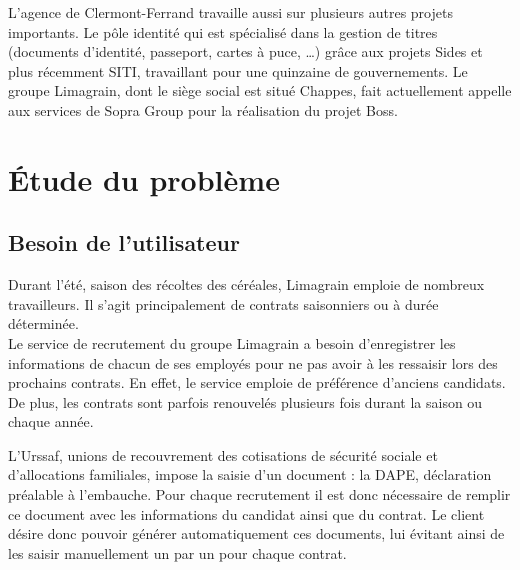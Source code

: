 L'agence de Clermont-Ferrand travaille aussi sur plusieurs autres projets importants.
Le pôle identité qui est spécialisé dans la gestion de titres (documents d'identité, passeport, cartes à puce, \ldots) grâce aux projets Sides et plus récemment SITI, travaillant pour une quinzaine de gouvernements.
Le groupe Limagrain, dont le siège social est situé Chappes, fait actuellement appelle aux services de Sopra Group pour la réalisation du projet Boss.


\section{Étude du problème}


\subsection{Besoin de l'utilisateur}

Durant l'été, saison des récoltes des céréales, Limagrain emploie de nombreux travailleurs.
Il s'agit principalement de contrats saisonniers ou à durée déterminée.
\\

Le service de recrutement du groupe Limagrain a besoin d'enregistrer les informations de chacun de ses employés pour ne pas avoir à les ressaisir lors des prochains contrats.
En effet, le service emploie de préférence d'anciens candidats.
De plus, les contrats sont parfois renouvelés plusieurs fois durant la saison ou chaque année.

L'Urssaf, unions de recouvrement des cotisations de sécurité sociale et d'allocations familiales, impose la saisie d'un document : la DAPE, déclaration préalable à l'embauche.
Pour chaque recrutement il est donc nécessaire de remplir ce document avec les informations du candidat ainsi que du contrat.
Le client désire donc pouvoir générer automatiquement ces documents, lui évitant ainsi de les saisir manuellement un par un pour chaque contrat.

